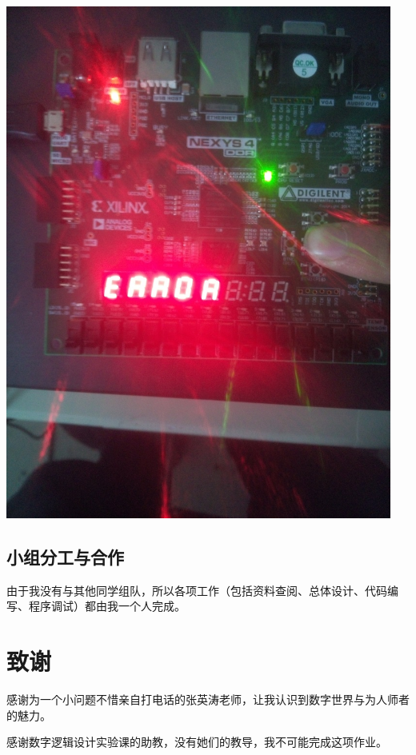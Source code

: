 \documentclass[11pt, a4paper]{article}
\begin{document}
\begin{CJK*}{UTF8}{gbsn}
\begin{appendices}
  \begin{center}
    \includegraphics[width = 5in]{error2.jpg}
  \end{center}
  
  \subsection*{小组分工与合作}


  由于我没有与其他同学组队，所以各项工作（包括资料查阅、总体设计、代码编写、程序调试）都由我一个人完成。
  
  \end{appendices}

  \section*{致谢}
  

  感谢为一个小问题不惜亲自打电话的张英涛老师，让我认识到数字世界与为人师者的魅力。

  感谢数字逻辑设计实验课的助教，没有她们的教导，我不可能完成这项作业。
  
  \newpage
\end{CJK*}
\end{document}
